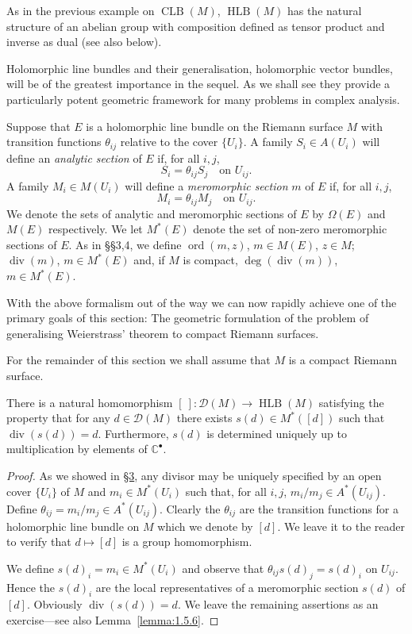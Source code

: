 As in the previous example on $\operatorname{CLB}(M)$, $\operatorname{HLB}(M)$ has the natural structure of an abelian group with composition defined as tensor product and inverse as dual (see also below).

Holomorphic line bundles and their generalisation, holomorphic vector bundles, will be of the greatest importance in the sequel. As we shall see they provide a particularly potent geometric framework for many problems in complex analysis.

Suppose that $E$ is a holomorphic line bundle on the Riemann surface $M$ with transition functions $\theta_{ij}$ relative to the cover $\{U_i\}$. A family $S_i\in A(U_i)$ will define an \emph{analytic section} of $E$ if, for all $i,j$,
\[ S_i=\theta_{ij}S_j\quad\text{on }U_{ij}. \]
A family $M_i\in M(U_i)$ will define a \emph{meromorphic section} $m$ of $E$ if, for all $i,j$,
\[ M_i=\theta_{ij}M_j\quad\text{on }U_{ij}. \]
We denote the sets of analytic and meromorphic sections of $E$ by $\Omega(E)$ and $M(E)$ respectively. We let $M^*(E)$ denote the set of non-zero meromorphic sections of $E$. As in \S\S3,4, we define $\operatorname{ord}(m,z)$, $m\in M(E)$, $z\in M$; $\operatorname{div}(m)$, $m\in M^*(E)$ and, if $M$ is compact, $\deg(\operatorname{div}(m))$, $m\in M^*(E)$.

With the above formalism out of the way we can now rapidly achieve one of the primary goals of this section: The geometric formulation of the problem of generalising Weierstrass' theorem to compact Riemann surfaces.

For the remainder of this section we shall assume that $M$ is a compact Riemann surface.

 There is a natural homomorphism $[\ ]:\mathcal D(M)\to\operatorname{HLB}(M)$ satisfying the property that for any $d\in\mathcal D(M)$ there exists $s(d)\in M^*([d])$ such that $\operatorname{div}(s(d))=d$. Furthermore, $s(d)$ is determined uniquely up to multiplication by elements of $\mathbb C^\bullet$.
\begin{proof}
As we showed in \hyperref[sec:1:3]{\S3}, any divisor may be uniquely specified by an open cover $\{U_i\}$ of $M$ and $m_i\in M^*(U_i)$ such that, for all $i,j$, $m_i/m_j\in A^*(U_{ij})$. Define $\theta_{ij}=m_i/m_j\in A^*(U_{ij})$. Clearly the $\theta_{ij}$ are
the transition functions for a holomorphic line bundle on $M$ which we denote by $[d]$. We leave it to the reader to verify that $d\mapsto[d]$ is a group homomorphism.

We define $s(d)_i=m_i\in M^*(U_i)$ and observe that $\theta_{ij}s(d)_j=s(d)_i$ on $U_{ij}$. Hence the $s(d)_i$ are the local representatives of a meromorphic section $s(d)$ of $[d]$. Obviously $\operatorname{div}(s(d))=d$. We leave the remaining assertions as an exercise---see also Lemma~\ref{lemma:1.5.6}.
\end{proof}
